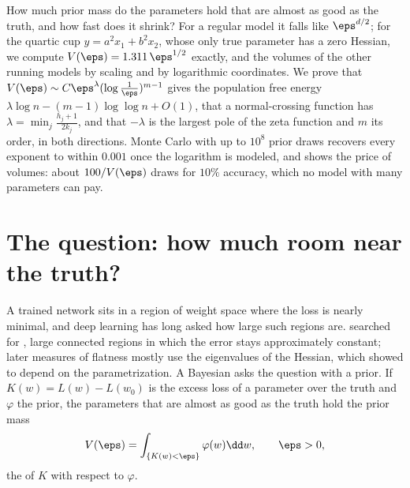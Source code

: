 \begin{refsection}

\begin{chaptersummary}
How much prior mass do the parameters hold that are almost as good as the truth, and how fast does it shrink? For a regular model it falls like $\eps^{d/2}$; for the quartic cup $y=a^2x_1+b^2x_2$, whose only true parameter has a zero Hessian, we compute $V(\eps)=1.311\,\eps^{1/2}$ exactly, and the volumes of the other running models by scaling and by logarithmic coordinates. We prove that $V(\eps)\sim C\eps^\lambda(\log\frac1\eps)^{m-1}$ gives the population free energy $\lambda\log n-(m-1)\log\log n+O(1)$, that a normal-crossing function has $\lambda=\min_j\frac{h_j+1}{2k_j}$, and that $-\lambda$ is the largest pole of the zeta function and $m$ its order, in both directions. Monte Carlo with up to $10^8$ prior draws recovers every exponent to within $0.001$ once the logarithm is modeled, and shows the price of volumes: about $100/V(\eps)$ draws for $10\%$ accuracy, which no model with many parameters can pay.
\end{chaptersummary}

\section{The question: how much room near the truth?}\label{sec:volume:question}

A trained network sits in a region of weight space where the loss is nearly minimal, and deep learning has long asked how large such regions are. \Textcite{HochreiterSchmidhuber1997} searched for , large connected regions in which the error stays approximately constant; later measures of flatness mostly use the eigenvalues of the Hessian, which \textcite{DinhEtAl2017} showed to depend on the parametrization. A Bayesian asks the question with a prior. If $K(w)=L(w)-L(w_0)$ is the excess loss of a parameter over the truth and $\varphi$ the prior, the parameters that are almost as good as the truth hold the prior mass
\begin{equation}\label{eq:volume:V}
V(\eps)=\int_{\{K(w)<\eps\}}\varphi(w)\dd w,\qquad\eps>0,
\end{equation}
the  of $K$ with respect to $\varphi$.


\end{refsection}
